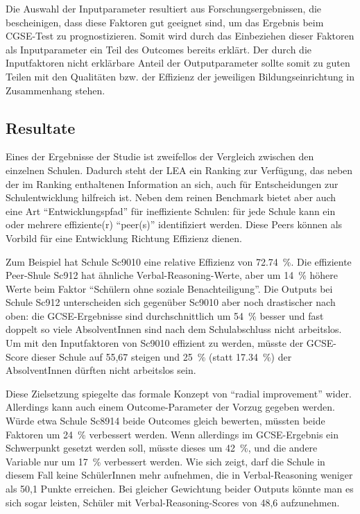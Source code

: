 Die Auswahl der Inputparameter resultiert aus Forschungsergebnissen, die bescheinigen, dass diese Faktoren gut geeignet sind, um das Ergebnis beim CGSE-Test zu prognostizieren.
Somit wird durch das Einbeziehen dieser Faktoren als Inputparameter ein Teil des Outcomes bereits erklärt.
Der durch die Inputfaktoren nicht erklärbare Anteil der Outputparameter sollte somit zu guten Teilen mit den Qualitäten bzw. der Effizienz der jeweiligen Bildungseinrichtung in Zusammenhang stehen.

\subsection{Resultate}
Eines der Ergebnisse der Studie ist zweifellos der Vergleich zwischen den einzelnen Schulen.
Dadurch steht der LEA ein Ranking zur Verfügung, das neben der im Ranking enthaltenen Information an sich, auch für Entscheidungen zur Schulentwicklung hilfreich ist.
Neben dem reinen Benchmark bietet \cite{thanassoulis_guiding_1994} aber auch eine Art "`Entwicklungspfad"' für ineffiziente Schulen: für jede Schule kann ein oder mehrere effiziente(r) "`peer(s)"' identifiziert werden.
Diese Peers können als Vorbild für eine Entwicklung Richtung Effizienz dienen.

Zum Beispiel hat Schule Sc9010 eine relative Effizienz von \SI{72,74}{\percent}.
Die effiziente Peer-Shule Sc912 hat ähnliche Verbal-Reasoning-Werte, aber um \SI{14}{\percent} höhere Werte beim Faktor "`Schülern ohne soziale Benachteiligung"'.
Die Outputs bei Schule Sc912 unterscheiden sich gegenüber Sc9010 aber noch drastischer nach oben: die GCSE-Ergebnisse sind durchschnittlich um \SI{54}{\percent} besser und fast doppelt so viele AbsolventInnen sind nach dem Schulabschluss nicht arbeitslos.
Um mit den Inputfaktoren von Sc9010 effizient zu werden, müsste der GCSE-Score dieser Schule auf 55,67 steigen und \SI{25}{\percent} (statt \SI{17,34}{\percent}) der AbsolventInnen dürften nicht arbeitslos sein.


Diese Zielsetzung spiegelte das formale Konzept von "`radial improvement"' wider.
Allerdings kann auch einem Outcome-Parameter der Vorzug gegeben werden.
Würde etwa Schule Sc8914 beide Outcomes gleich bewerten, müssten beide Faktoren um \SI{24}{\percent} verbessert werden.
Wenn allerdings im GCSE-Ergebnis ein Schwerpunkt gesetzt werden soll, müsste dieses um \SI{42}{\percent}, und die andere Variable nur um \SI{17}{\percent} verbessert werden.
Wie sich zeigt, darf die Schule in diesem Fall keine SchülerInnen mehr aufnehmen, die in Verbal-Reasoning weniger als 50,1 Punkte erreichen.
Bei gleicher Gewichtung beider Outputs könnte man es sich sogar leisten, Schüler mit Verbal-Reasoning-Scores von 48,6 aufzunehmen.

